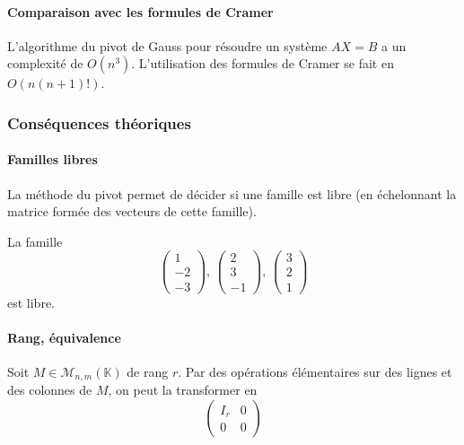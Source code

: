   \paragraph{Comparaison avec les formules de Cramer}


  \begin{theorem}
    L'algorithme du pivot de Gauss pour résoudre un système $AX = B$ a un complexité de $O(n^3)$. L'utilisation des formules de Cramer se fait en $O(n(n+1)!)$.
  \end{theorem}

  \subsubsection{Conséquences théoriques}

  \paragraph{Familles libres}


  \begin{proposition}
    La méthode du pivot permet de décider si une famille est libre (en échelonnant la matrice formée des vecteurs de cette famille).
  \end{proposition}

  \begin{example}
    La famille
    \[ \begin{pmatrix} 1 \\ -2 \\ -3 \end{pmatrix}, \, \begin{pmatrix} 2 \\ 3 \\ -1 \end{pmatrix}, \, \begin{pmatrix} 3 \\ 2 \\ 1 \end{pmatrix} \]
    est libre.
  \end{example}

  \paragraph{Rang, équivalence}


  \begin{proposition}
    Soit $M \in \mathcal{M}_{n,m}(\mathbb{K})$ de rang $r$. Par des opérations élémentaires sur des lignes et des colonnes de $M$, on peut la transformer en
    \[
      \begin{pmatrix}
        I_r & 0 \\
        0 & 0
      \end{pmatrix}
    \]
  \end{proposition}

